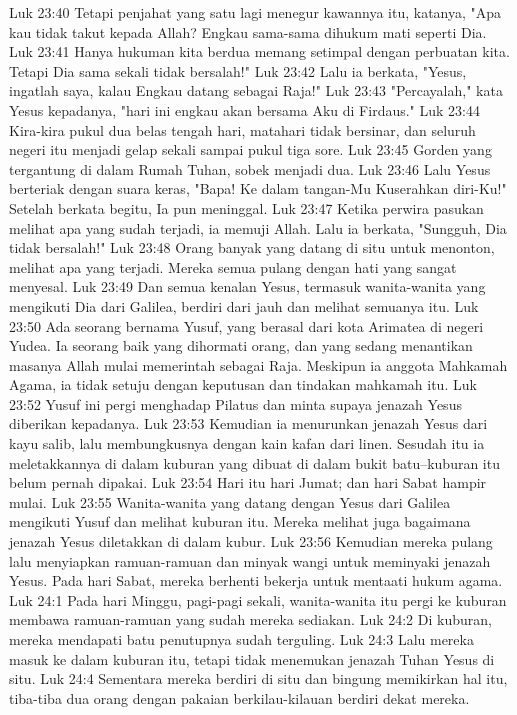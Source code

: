Luk 23:40  Tetapi penjahat yang satu lagi menegur kawannya itu, katanya, "Apa kau tidak takut kepada Allah? Engkau sama-sama dihukum mati seperti Dia.
Luk 23:41  Hanya hukuman kita berdua memang setimpal dengan perbuatan kita. Tetapi Dia sama sekali tidak bersalah!"
Luk 23:42  Lalu ia berkata, "Yesus, ingatlah saya, kalau Engkau datang sebagai Raja!"
Luk 23:43  "Percayalah," kata Yesus kepadanya, "hari ini engkau akan bersama Aku di Firdaus."
Luk 23:44  Kira-kira pukul dua belas tengah hari, matahari tidak bersinar, dan seluruh negeri itu menjadi gelap sekali sampai pukul tiga sore.
Luk 23:45  Gorden yang tergantung di dalam Rumah Tuhan, sobek menjadi dua.
Luk 23:46  Lalu Yesus berteriak dengan suara keras, "Bapa! Ke dalam tangan-Mu Kuserahkan diri-Ku!" Setelah berkata begitu, Ia pun meninggal.
Luk 23:47  Ketika perwira pasukan melihat apa yang sudah terjadi, ia memuji Allah. Lalu ia berkata, "Sungguh, Dia tidak bersalah!"
Luk 23:48  Orang banyak yang datang di situ untuk menonton, melihat apa yang terjadi. Mereka semua pulang dengan hati yang sangat menyesal.
Luk 23:49  Dan semua kenalan Yesus, termasuk wanita-wanita yang mengikuti Dia dari Galilea, berdiri dari jauh dan melihat semuanya itu.
Luk 23:50  Ada seorang bernama Yusuf, yang berasal dari kota Arimatea di negeri Yudea. Ia seorang baik yang dihormati orang, dan yang sedang menantikan masanya Allah mulai memerintah sebagai Raja. Meskipun ia anggota Mahkamah Agama, ia tidak setuju dengan keputusan dan tindakan mahkamah itu.
Luk 23:52  Yusuf ini pergi menghadap Pilatus dan minta supaya jenazah Yesus diberikan kepadanya.
Luk 23:53  Kemudian ia menurunkan jenazah Yesus dari kayu salib, lalu membungkusnya dengan kain kafan dari linen. Sesudah itu ia meletakkannya di dalam kuburan yang dibuat di dalam bukit batu--kuburan itu belum pernah dipakai.
Luk 23:54  Hari itu hari Jumat; dan hari Sabat hampir mulai.
Luk 23:55  Wanita-wanita yang datang dengan Yesus dari Galilea mengikuti Yusuf dan melihat kuburan itu. Mereka melihat juga bagaimana jenazah Yesus diletakkan di dalam kubur.
Luk 23:56  Kemudian mereka pulang lalu menyiapkan ramuan-ramuan dan minyak wangi untuk meminyaki jenazah Yesus. Pada hari Sabat, mereka berhenti bekerja untuk mentaati hukum agama.
Luk 24:1  Pada hari Minggu, pagi-pagi sekali, wanita-wanita itu pergi ke kuburan membawa ramuan-ramuan yang sudah mereka sediakan.
Luk 24:2  Di kuburan, mereka mendapati batu penutupnya sudah terguling.
Luk 24:3  Lalu mereka masuk ke dalam kuburan itu, tetapi tidak menemukan jenazah Tuhan Yesus di situ.
Luk 24:4  Sementara mereka berdiri di situ dan bingung memikirkan hal itu, tiba-tiba dua orang dengan pakaian berkilau-kilauan berdiri dekat mereka.
